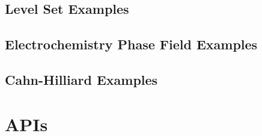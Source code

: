\documentclass[letterpaper]{book}
\begin{document}
\chapter{Level Set Examples}


\newpage

\newpage

\newpage

\newpage

\newpage

\newpage

\chapter{Electrochemistry Phase Field Examples}


\newpage

\newpage

\newpage

\newpage

\newpage

\newpage

\newpage

\newpage

\newpage

\newpage

\newpage

\chapter{Cahn-Hilliard Examples}


\newpage


% 
% 
% 
% 
% 
 
\appendix

\part{APIs}


\parttoc




\backmatter


\printindex
\end{document}
